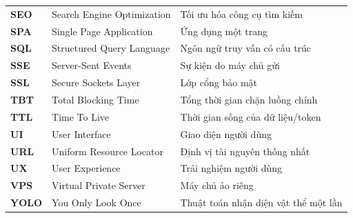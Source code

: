 \documentclass[../DoAn.tex]{subfiles}
\begin{document}
\begin{longtable}{l p{6.5cm} p{6.5cm}}
	\textbf{SEO} & Search Engine Optimization & Tối ưu hóa công cụ tìm kiếm \\
	\textbf{SPA} & Single Page Application & Ứng dụng một trang \\
	\textbf{SQL} & Structured Query Language & Ngôn ngữ truy vấn có cấu trúc \\
	\textbf{SSE} & Server-Sent Events & Sự kiện do máy chủ gửi \\
	\textbf{SSL} & Secure Sockets Layer & Lớp cổng bảo mật \\
	\textbf{TBT} & Total Blocking Time & Tổng thời gian chặn luồng chính \\
	\textbf{TTL} & Time To Live & Thời gian sống của dữ liệu/token \\
	\textbf{UI} & User Interface & Giao diện người dùng \\
	\textbf{URL} & Uniform Resource Locator & Định vị tài nguyên thống nhất \\
	\textbf{UX} & User Experience & Trải nghiệm người dùng \\
	\textbf{VPS} & Virtual Private Server & Máy chủ ảo riêng \\
	\textbf{YOLO} & You Only Look Once & Thuật toán nhận diện vật thể một lần \\
    \hline
\end{longtable}
\end{document}

